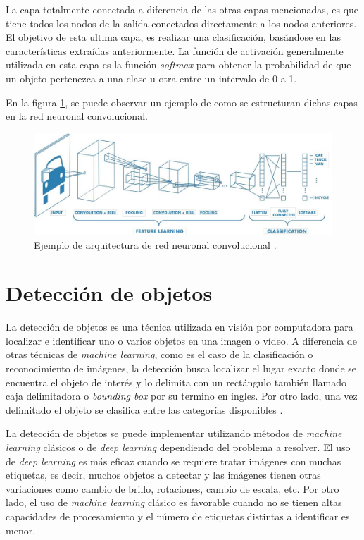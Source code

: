 La capa totalmente conectada a diferencia de las otras capas mencionadas, es que tiene todos los nodos de la salida conectados directamente a los nodos anteriores. El objetivo de esta ultima capa, es realizar una clasificación, basándose en las características extraídas anteriormente. La función de activación generalmente utilizada en esta capa es la función \textit{softmax} para obtener la probabilidad de que un objeto pertenezca a una clase u otra entre un intervalo de 0 a 1.

En la figura \ref{fig:cnn}, se puede observar un ejemplo de como se estructuran dichas capas en la red neuronal convolucional.


\begin{figure}[ht]
	\centering
	\includegraphics[scale=.45]{./Figures/cnn-image.jpeg}
	\caption{Ejemplo de arquitectura de red neuronal convolucional \cite{WEBSITE:2}.}
	\label{fig:cnn}
\end{figure}


\section{Detección de objetos}

La detección de objetos es una técnica utilizada en visión por computadora para localizar e identificar uno o varios objetos en una imagen o vídeo. A diferencia de otras técnicas de \textit{machine learning}, como es el caso de la clasificación o reconocimiento de imágenes, la detección busca localizar el lugar exacto donde se encuentra el objeto de interés y lo delimita con un rectángulo también llamado caja delimitadora o \textit{bounding box} por su termino en ingles. Por otro lado, una vez delimitado el objeto se clasifica entre las categorías disponibles \cite{WEBSITE:5}.

La detección de objetos se puede implementar utilizando métodos de \textit{machine learning} clásicos o de \textit{deep learning} dependiendo del problema a resolver\cite{WEBSITE:6}. El uso de \textit{deep learning} es más eficaz cuando se requiere tratar imágenes con muchas etiquetas, es decir, muchos objetos a detectar y las imágenes tienen otras variaciones como cambio de brillo, rotaciones, cambio de escala, etc. Por otro lado, el uso de \textit{machine learning} clásico es favorable cuando no se tienen altas capacidades de procesamiento y el número de etiquetas distintas a identificar es menor.

